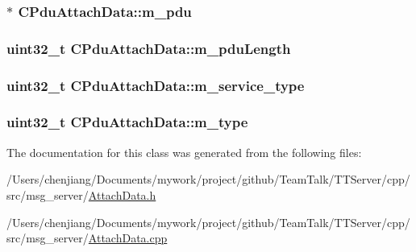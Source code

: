 \subsubsection[{m\+\_\+pdu}]{$\ast$ C\+Pdu\+Attach\+Data\+::m\+\_\+pdu\hspace{0.3cm}{\ttfamily [private]}}\label{class_c_pdu_attach_data_ad1e3ebf95042873fc5cb85f70e6bd305}
\hypertarget{class_c_pdu_attach_data_a900482e69fbe04fa18b3344bef50804d}{}
\subsubsection[{m\+\_\+pdu\+Length}]{\setlength{\rightskip}{0pt plus 5cm}uint32\+\_\+t C\+Pdu\+Attach\+Data\+::m\+\_\+pdu\+Length\hspace{0.3cm}{\ttfamily [private]}}\label{class_c_pdu_attach_data_a900482e69fbe04fa18b3344bef50804d}
\hypertarget{class_c_pdu_attach_data_a9e0f60cb2ad49621fe88671d2059c96c}{}
\subsubsection[{m\+\_\+service\+\_\+type}]{\setlength{\rightskip}{0pt plus 5cm}uint32\+\_\+t C\+Pdu\+Attach\+Data\+::m\+\_\+service\+\_\+type\hspace{0.3cm}{\ttfamily [private]}}\label{class_c_pdu_attach_data_a9e0f60cb2ad49621fe88671d2059c96c}
\hypertarget{class_c_pdu_attach_data_a66859b15760dc9fcae1067f72c172223}{}
\subsubsection[{m\+\_\+type}]{\setlength{\rightskip}{0pt plus 5cm}uint32\+\_\+t C\+Pdu\+Attach\+Data\+::m\+\_\+type\hspace{0.3cm}{\ttfamily [private]}}\label{class_c_pdu_attach_data_a66859b15760dc9fcae1067f72c172223}


The documentation for this class was generated from the following files\+:\begin{DoxyCompactItemize}
\item 
/\+Users/chenjiang/\+Documents/mywork/project/github/\+Team\+Talk/\+T\+T\+Server/cpp/src/msg\+\_\+server/\hyperlink{_attach_data_8h}{Attach\+Data.\+h}\item 
/\+Users/chenjiang/\+Documents/mywork/project/github/\+Team\+Talk/\+T\+T\+Server/cpp/src/msg\+\_\+server/\hyperlink{_attach_data_8cpp}{Attach\+Data.\+cpp}\end{DoxyCompactItemize}
